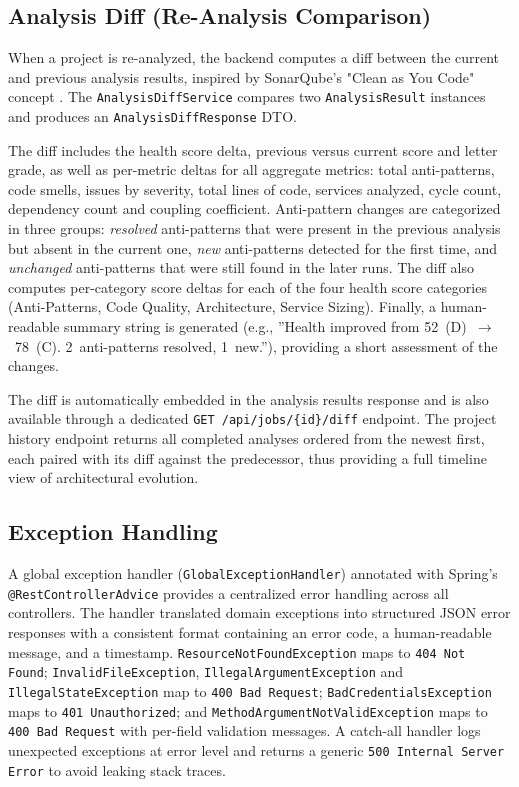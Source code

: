 \subsection{Analysis Diff (Re-Analysis Comparison)}
\label{subsec:analysis-diff}

 \par When a project is re-analyzed, the backend computes a diff between the current and previous analysis results, inspired by SonarQube's "Clean as You Code" concept \cite{SonQ}. The \texttt{AnalysisDiffService} compares two \texttt{AnalysisResult} instances and produces an \texttt{AnalysisDiffResponse} DTO.

The diff includes the health score delta, previous versus current score and letter grade, as well as per-metric deltas for all aggregate metrics: total anti-patterns, code smells, issues by severity, total lines of code, services analyzed, cycle count, dependency count and coupling coefficient. Anti-pattern changes are categorized in three groups: \textit{resolved} anti-patterns that were present in the previous analysis but absent in the current one, \textit{new} anti-patterns detected for the first time, and \textit{unchanged} anti-patterns that were still found in the later runs. The diff also computes per-category score deltas for each of the four health score categories (Anti-Patterns, Code Quality, Architecture, Service Sizing). Finally, a human-readable summary string is generated (e.g., ''Health improved from 52~(D)~$\to$~78~(C). 2~anti-patterns resolved, 1~new.''), providing a short assessment of the changes.

The diff is automatically embedded in the analysis results response and is also available through a dedicated \texttt{GET /api/jobs/\{id\}/diff} endpoint. The project history endpoint returns all completed analyses ordered from the newest first, each paired with its diff against the predecessor, thus providing a full timeline view of architectural evolution.

\subsection{Exception Handling}
\label{subsec:exception-handling}

 \par A global exception handler (\texttt{GlobalExceptionHandler}) annotated with Spring's \texttt{@RestControllerAdvice} provides a centralized error handling across all controllers. The handler translated domain exceptions into structured JSON error responses with a consistent format containing an error code, a human-readable message, and a timestamp. \texttt{ResourceNotFoundException} maps to \texttt{404 Not Found}; \texttt{InvalidFileException}, \texttt{IllegalArgumentException} and \texttt{IllegalStateException} map to \texttt{400 Bad Request}; \texttt{Bad\-Cre\-den\-tialsEx\-cep\-tion} maps to \texttt{401 Unauthorized}; and \texttt{Me\-thodAr\-gu\-mentNotVa\-lidEx\-ception} maps to \texttt{400 Bad Request} with per-field validation messages. A catch-all handler logs unexpected exceptions at error level and returns a generic \texttt{500 Internal Server Error} to avoid leaking stack traces.

